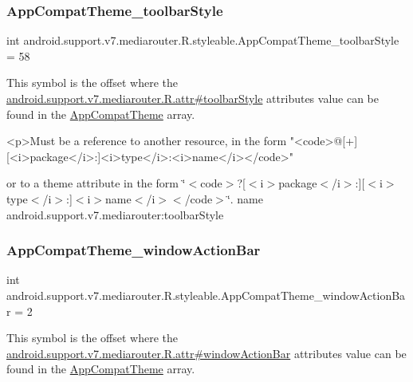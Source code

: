 \subsubsection{\texorpdfstring{App\+Compat\+Theme\+\_\+toolbar\+Style}{AppCompatTheme\_toolbarStyle}}
{\footnotesize\ttfamily int android.\+support.\+v7.\+mediarouter.\+R.\+styleable.\+App\+Compat\+Theme\+\_\+toolbar\+Style = 58\hspace{0.3cm}{\ttfamily [static]}}

This symbol is the offset where the \hyperlink{classandroid_1_1support_1_1v7_1_1mediarouter_1_1R_1_1attr_a1ce19f1edb30dec57298428b39ef2a46}{android.\+support.\+v7.\+mediarouter.\+R.\+attr\#toolbar\+Style} attribute\textquotesingle{}s value can be found in the \hyperlink{classandroid_1_1support_1_1v7_1_1mediarouter_1_1R_1_1styleable_a4e3d3900c75d49aeb2f283cac00214d6}{App\+Compat\+Theme} array.

\begin{DoxyVerb}      <p>Must be a reference to another resource, in the form "<code>@[+][<i>package</i>:]<i>type</i>:<i>name</i></code>"
\end{DoxyVerb}
 or to a theme attribute in the form \char`\"{}$<$code$>$?\mbox{[}$<$i$>$package$<$/i$>$\+:\mbox{]}\mbox{[}$<$i$>$type$<$/i$>$\+:\mbox{]}$<$i$>$name$<$/i$>$$<$/code$>$\char`\"{}.  name android.\+support.\+v7.\+mediarouter\+:toolbar\+Style \mbox{\label{classandroid_1_1support_1_1v7_1_1mediarouter_1_1R_1_1styleable_ad5254bfaca20d46ec980af0056e2a282}} 
\subsubsection{\texorpdfstring{App\+Compat\+Theme\+\_\+window\+Action\+Bar}{AppCompatTheme\_windowActionBar}}
{\footnotesize\ttfamily int android.\+support.\+v7.\+mediarouter.\+R.\+styleable.\+App\+Compat\+Theme\+\_\+window\+Action\+Bar = 2\hspace{0.3cm}{\ttfamily [static]}}

This symbol is the offset where the \hyperlink{classandroid_1_1support_1_1v7_1_1mediarouter_1_1R_1_1attr_a91fe25780bb1bdc502dc1c2a33c8549d}{android.\+support.\+v7.\+mediarouter.\+R.\+attr\#window\+Action\+Bar} attribute\textquotesingle{}s value can be found in the \hyperlink{classandroid_1_1support_1_1v7_1_1mediarouter_1_1R_1_1styleable_a4e3d3900c75d49aeb2f283cac00214d6}{App\+Compat\+Theme} array.

